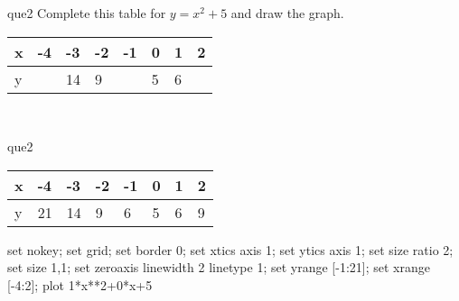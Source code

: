 \documentclass[13.5pt, varwidth=true]{beamer}
\begin{document}
\begin{frame}[shrink=19,fragile]
	\begin{beamercolorbox}[rounded=true, left, shadow=true,wd=14.8cm]{que2}
		 Complete this table for $y = x^{2} + 5$ and draw the graph. \\[0.3cm] \renewcommand{\arraystretch}{1.2}\begin{tabular}{|C|C|C|C|C|C|C|C|} \hline x & -4 & -3 & -2 & -1 & 0 & 1 & 2 \\ \hline y &  & 14 & 9 &  & 5 & 6 & \\ \hline \end{tabular}\\[0.3cm]
	\end{beamercolorbox}
\end{frame}
\begin{frame}[shrink=19,fragile]
	\begin{beamercolorbox}[rounded=true, left, shadow=true,wd=14.8cm]{que2}
 		\renewcommand{\arraystretch}{1.2}\begin{tabular}{|C|C|C|C|C|C|C|C|} \hline x & -4 & -3 & -2 & -1 & 0 & 1 & 2 \\ \hline y & 21 & 14 & 9 & 6 & 5 & 6 & 9\\ \hline \end{tabular}\begin{gnuplot}[terminal=pdf] set nokey; set grid; set border 0; set xtics axis 1; set ytics axis 1; set size ratio 2; set size 1,1; set zeroaxis linewidth 2 linetype 1; set yrange [-1:21]; set xrange [-4:2]; plot 1*x**2+0*x+5 \end{gnuplot}
	\end{beamercolorbox}
\end{frame}
\end{document}
